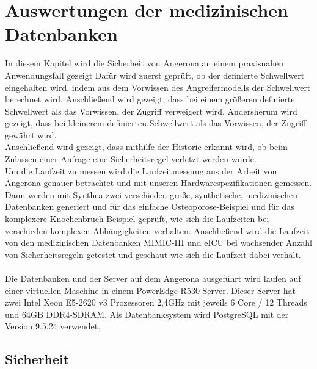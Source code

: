 \documentclass[german,version-2020-11]{uzl-thesis}
\begin{document}
\chapter{Auswertungen der medizinischen Datenbanken }\label{chap:Auswertung}
In diesem Kapitel wird die Sicherheit von Angerona an einem praxisnahen Anwendungsfall gezeigt Dafür wird zuerst geprüft, ob der definierte Schwellwert eingehalten wird, indem aus dem Vorwissen des Angreifermodells der Schwellwert berechnet wird. Anschließend wird gezeigt, dass bei einem größeren definierte Schwellwert als das Vorwissen, der Zugriff verweigert wird. Andersherum wird gezeigt, dass bei kleinerem definierten Schwellwert als das Vorwissen, der Zugriff gewährt wird.\\  Anschließend wird gezeigt, dass mithilfe der Historie erkannt wird, ob beim Zulassen einer Anfrage eine Sicherheitsregel verletzt werden würde. \\ Um die Laufzeit zu messen wird die Laufzeitmessung aus der Arbeit von Angerona genauer betrachtet und mit unseren Hardwarespezifikationen gemessen. Dann werden mit Synthea zwei verschieden große, synthetische, medizinischen Datenbanken generiert und  für das einfache Osteoporose-Beispiel und für das komplexere Knochenbruch-Beispiel geprüft, wie sich die Laufzeiten bei verschieden komplexen Abhängigkeiten verhalten. Anschließend wird die Laufzeit von den medizinischen Datenbanken MIMIC-III und eICU bei wachsender Anzahl von Sicherheitsregeln getestet und geschaut wie sich die Laufzeit dabei verhält. \\ \\
Die Datenbanken und der Server auf dem Angerona ausgeführt wird laufen auf einer virtuellen Maschine in einem PowerEdge R530 Server. Dieser Server hat zwei Intel Xeon E5-2620 v3 Prozessoren 2,4GHz mit jeweils 6 Core / 12 Threads und 64GB DDR4-SDRAM. Als Datenbanksystem wird PostgreSQL mit der Version 9.5.24 verwendet. \\ 

\section{Sicherheit}
\end{document}
